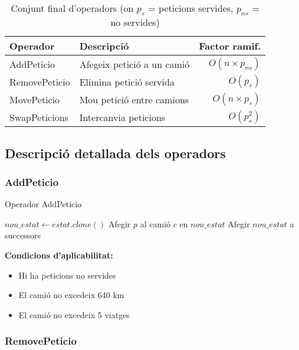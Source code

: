\begin{table}[H]
\centering
\begin{tabular}{@{}llr@{}}
\toprule
\textbf{Operador} & \textbf{Descripció} & \textbf{Factor ramif.} \\
\midrule
AddPeticio & Afegeix petició a un camió & $O(n \times p_{ns})$ \\
RemovePeticio & Elimina petició servida & $O(p_s)$ \\
MovePeticio & Mou petició entre camions & $O(n \times p_s)$ \\
SwapPeticions & Intercanvia peticions & $O(p_s^2)$ \\
\bottomrule
\end{tabular}
\caption{Conjunt final d'operadors (on $p_s$ = peticions servides, $p_{ns}$ = no servides)}
\label{tab:operators-final}
\end{table}

\subsection{Descripció detallada dels operadors}

\subsubsection{AddPeticio}

\begin{algorithm}[H]
\caption{Operador AddPeticio}
\begin{algorithmic}[1]
        \State $nou\_estat \gets estat.clone()$
        \State Afegir $p$ al camió $c$ en $nou\_estat$
            \State Afegir $nou\_estat$ a successors
        \EndIf
    \EndFor
\EndFor
\end{algorithmic}
\end{algorithm}

\textbf{Condicions d'aplicabilitat:}
\begin{itemize}
    \item Hi ha peticions no servides
    \item El camió no excedeix 640 km
    \item El camió no excedeix 5 viatges
\end{itemize}

\subsubsection{RemovePeticio}

